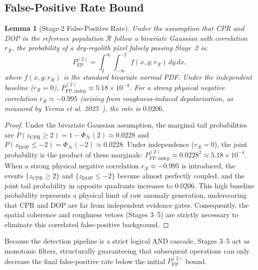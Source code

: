 \documentclass[10pt,conference]{IEEEtran}
\newtheorem{lemma}[theorem]{Lemma}
\newcommand{\CPR}{\mathrm{CPR}}
\newcommand{\DOP}{\mathrm{DOP}}
\begin{document}
\subsection{False-Positive Rate Bound}

\begin{lemma}[Stage-2 False-Positive Rate]
\label{lem:fp}
Under the assumption that CPR and DOP in the reference population $\mathcal{R}$ follow a bivariate Gaussian with correlation $r_{\mathcal{R}}$, the probability of a dry-regolith pixel falsely passing Stage~2 is:
\begin{equation}
P_{\mathrm{FP}}^{(2)} = \int_{2}^{\infty} \int_{-\infty}^{-2} f(x, y; r_{\mathcal{R}}) \, dy \, dx,
\label{eq:fpbound}
\end{equation}
where $f(x,y; r_{\mathcal{R}})$ is the standard bivariate normal PDF. Under the independent baseline ($r_{\mathcal{R}} = 0$), $P_{\mathrm{FP},\mathrm{indep}}^{(2)} \approx 5.18 \times 10^{-4}$. For a strong physical negative correlation $r_{\mathcal{R}} \approx -0.995$ (arising from roughness-induced depolarization, as measured by Verma et al. 2025~\cite{verma2025dfsar}), the rate is $0.0206$.
\end{lemma}

\begin{proof}
Under the bivariate Gaussian assumption, the marginal tail probabilities are $P(z_{\CPR} \ge 2) = 1 - \Phi_{\mathcal{N}}(2) \approx 0.0228$ and $P(z_{\DOP} \le -2) = \Phi_{\mathcal{N}}(-2) \approx 0.0228$. Under independence ($r_{\mathcal{R}} = 0$), the joint probability is the product of these marginals: $P_{\mathrm{FP},\mathrm{indep}}^{(2)} \approx 0.0228^2 \approx 5.18 \times 10^{-4}$. When a strong physical negative correlation $r_{\mathcal{R}} \approx -0.995$ is introduced, the events $\{z_{\CPR} \ge 2\}$ and $\{z_{\DOP} \le -2\}$ become almost perfectly coupled, and the joint tail probability in opposite quadrants increases to $0.0206$. This high baseline probability represents a physical limit of raw anomaly generation, underscoring that CPR and DOP are far from independent evidence gates. Consequently, the spatial coherence and roughness vetoes (Stages 3--5) are strictly necessary to eliminate this correlated false-positive background.
\end{proof}

Because the detection pipeline is a strict logical AND cascade, Stages 3--5 act as monotonic filters, structurally guaranteeing that subsequent operations can only decrease the final false-positive rate below the initial $P_{\mathrm{FP}}^{(2)}$ bound.
\end{document}

